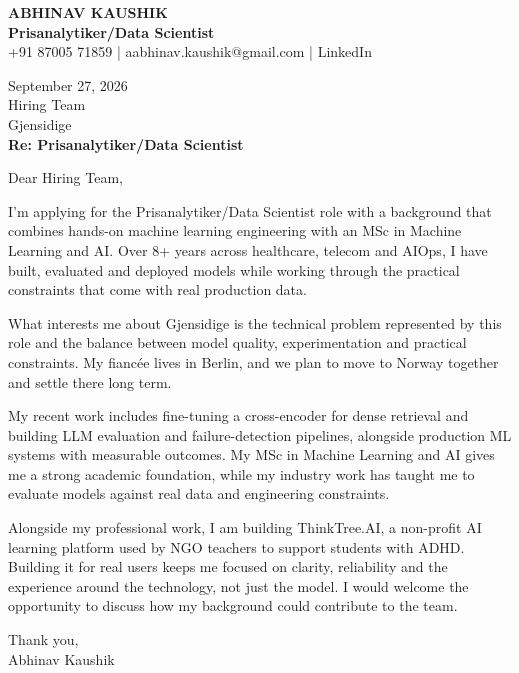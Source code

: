 \documentclass[10pt,a4paper]{article}
\begin{document}
\begin{center}
{\Large\bfseries ABHINAV KAUSHIK}\\[2pt]
{\bfseries Prisanalytiker/Data Scientist}\\[2pt]
+91 87005 71859 \quad | \quad aabhinav.kaushik@gmail.com \quad | \quad LinkedIn
\end{center}
\vspace{8pt}
September 27, 2026\\[6pt]
Hiring Team\\
Gjensidige\\[4pt]
\textbf{Re: Prisanalytiker/Data Scientist}

Dear Hiring Team,

I’m applying for the Prisanalytiker/Data Scientist role with a background that combines hands-on machine learning engineering with an MSc in Machine Learning and AI. Over 8+ years across healthcare, telecom and AIOps, I have built, evaluated and deployed models while working through the practical constraints that come with real production data.

What interests me about Gjensidige is the technical problem represented by this role and the balance between model quality, experimentation and practical constraints. My fiancée lives in Berlin, and we plan to move to Norway together and settle there long term.

My recent work includes fine-tuning a cross-encoder for dense retrieval and building LLM evaluation and failure-detection pipelines, alongside production ML systems with measurable outcomes. My MSc in Machine Learning and AI gives me a strong academic foundation, while my industry work has taught me to evaluate models against real data and engineering constraints.

Alongside my professional work, I am building ThinkTree.AI, a non-profit AI learning platform used by NGO teachers to support students with ADHD. Building it for real users keeps me focused on clarity, reliability and the experience around the technology, not just the model. I would welcome the opportunity to discuss how my background could contribute to the team.

Thank you,\\
Abhinav Kaushik
\end{document}
